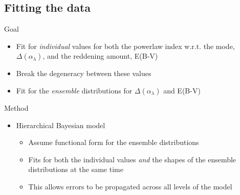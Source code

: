 \documentclass[landscape,9pt]{beamer}
\begin{document}
\subsection{Fitting the data}
\begin{frame}
	\begin{block}{Goal}
		\begin{itemize}
			\item{Fit for {\em individual} values for both the powerlaw index w.r.t. the mode, $\Delta(\alpha_\lambda)$, and the reddening amount, E(B-V)}
			\item{Break the degeneracy between these values}
			\item{Fit for the {\em ensemble} distributions for $\Delta(\alpha_\lambda)$ and E(B-V)}
		\end{itemize}
	\end{block}
	\begin{block}{Method}
		\begin{itemize}
			\item{Hierarchical Bayesian model}
				\begin{itemize}
					\item{Assume functional form for the ensemble distributions}
					\item{Fits for both the individual values {\em and} the shapes of the ensemble distributions at the same time}
					\item{This allows errors to be propagated across all levels of the model}
				\end{itemize}
		\end{itemize}
	\end{block}	
\end{frame}
\end{document}
